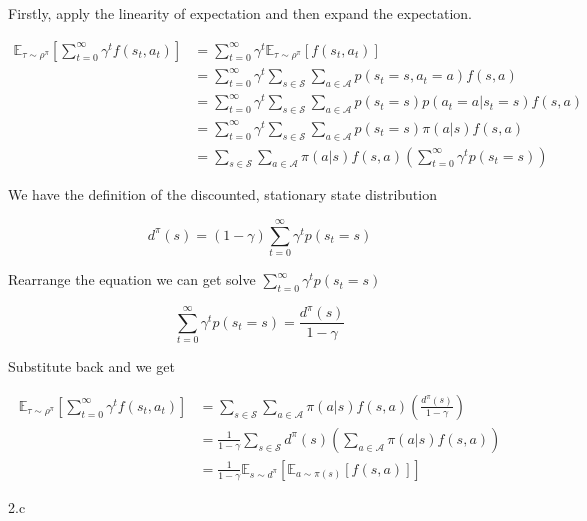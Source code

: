 \begin{answer}
  Firstly, apply the linearity of expectation and then expand the expectation.

  \begin{align*}
  \mathbb{E}_{\tau\sim\rho^{\pi}}\left[\sum_{t=0}^{\infty}\gamma^{t}f(s_{t},a_{t})\right] &= \sum_{t=0}^{\infty}\gamma^{t}\mathbb{E}_{\tau\sim\rho^{\pi}}[f(s_{t},a_{t})] \\
    &= \sum_{t=0}^{\infty}\gamma^{t}\sum_{s \in \mathcal{S}} \sum_{a \in \mathcal{A}} p(s_t=s, a_t=a) f(s,a) \\
    &= \sum_{t=0}^{\infty}\gamma^{t}\sum_{s \in \mathcal{S}} \sum_{a \in \mathcal{A}} p(s_t=s) p(a_t=a | s_t=s) f(s,a) \\
    &= \sum_{t=0}^{\infty}\gamma^{t}\sum_{s \in \mathcal{S}} \sum_{a \in \mathcal{A}} p(s_t=s) \pi(a|s) f(s,a) \\
    &= \sum_{s \in \mathcal{S}} \sum_{a \in \mathcal{A}} \pi(a|s) f(s,a) \left(\sum_{t=0}^{\infty}\gamma^{t} p(s_t=s)\right)
  \end{align*}

  We have the definition of the discounted, stationary state distribution

  $$
  d^{\pi}(s) = (1-\gamma)\sum_{t=0}^{\infty}\gamma^{t}p(s_{t}=s)
  $$


  Rearrange the equation we can get solve $\sum_{t=0}^{\infty}\gamma^{t} p(s_t=s)$

  $$
  \sum_{t=0}^{\infty}\gamma^{t}p(s_t=s) = \frac{d^{\pi}(s)}{1-\gamma}
  $$

  Substitute back and we get

  \begin{align*}
  \mathbb{E}_{\tau\sim\rho^{\pi}}\left[\sum_{t=0}^{\infty}\gamma^{t}f(s_{t},a_{t})\right] &= \sum_{s \in \mathcal{S}} \sum_{a \in \mathcal{A}} \pi(a|s) f(s,a) \left(\frac{d^{\pi}(s)}{1-\gamma}\right) \\
    &= \frac{1}{1-\gamma} \sum_{s \in \mathcal{S}} d^{\pi}(s) \left(\sum_{a \in \mathcal{A}} \pi(a|s) f(s,a)\right) \\
    &= \frac{1}{1-\gamma}\mathbb{E}_{s\sim d^{\pi}}[\mathbb{E}_{a\sim\pi(s)}[f(s,a)]]
  \end{align*}

\end{answer}
\clearpage

\LARGE
2.c
\normalsize

